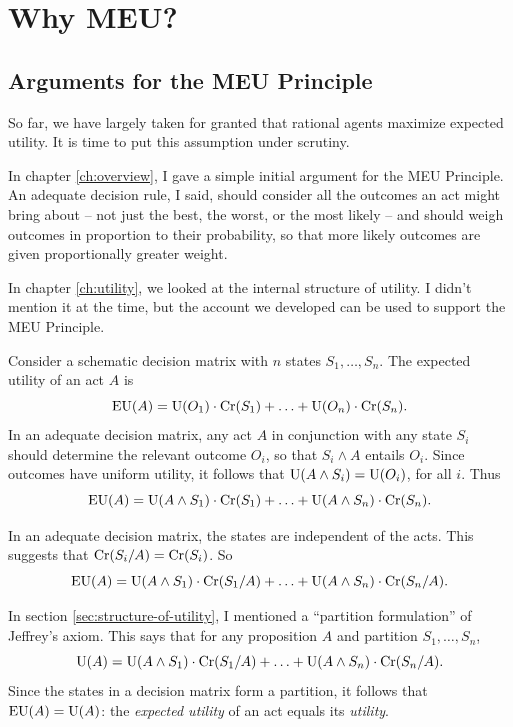 \chapter{Why MEU?}\label{ch:risk}

\section{Arguments for the MEU Principle}\label{sec:why-meu}

So far, we have largely taken for granted that rational agents maximize expected
utility. It is time to put this assumption under scrutiny.

In chapter \ref{ch:overview}, I gave a simple initial argument for the MEU
Principle. An adequate decision rule, I said, should consider all the outcomes
an act might bring about -- not just the best, the worst, or the most likely --
and should weigh outcomes in proportion to their probability, so that
more likely outcomes are given proportionally greater weight.

In chapter \ref{ch:utility}, we looked at the internal structure of utility. I
didn't mention it at the time, but the account we developed can be used to
support the MEU Principle.

Consider a schematic decision matrix with $n$ states $S_{1},\ldots,S_{n}$. The
expected utility of an act $A$ is
\[
  \text{EU}(A) = \text{U}(O_{1})\cdot \text{Cr}(S_{1}) + \ldots + \text{U}(O_{n})\cdot \text{Cr}(S_{n}).
\]
In an adequate decision matrix, any act $A$ in conjunction with any state
$S_{i}$ should determine the relevant outcome $O_{i}$, so that $S_{i} \land A$
entails $O_{i}$. Since outcomes have uniform utility, it follows that
$\text{U}(A \land S_{i}) = \text{U}(O_{i})$, for all $i$. Thus
\[
  \text{EU}(A) = \text{U}(A \land S_{1})\cdot \text{Cr}(S_{1}) + \ldots + \text{U}(A \land S_{n})\cdot \text{Cr}(S_{n}).
\]

In an adequate decision matrix, the states are independent of the acts. This suggests that $\text{Cr}(S_{i} / A) = \text{Cr}(S_{i})$. So
\[
  \text{EU}(A) = \text{U}(A \land S_{1})\cdot \text{Cr}(S_{1}/A) + \ldots + \text{U}(A \land S_{n})\cdot \text{Cr}(S_{n}/A).
\]

In section \ref{sec:structure-of-utility}, I mentioned a ``partition
formulation'' of Jeffrey's axiom. This says that for any proposition $A$ and
partition $S_{1},\ldots,S_{n}$,
\[
  \text{U}(A) = \text{U}(A \land S_{1})\cdot \text{Cr}(S_{1}/A) + \ldots + \text{U}(A \land S_{n})\cdot \text{Cr}(S_{n}/A).
\]
Since the states in a decision matrix form a partition, it follows that
$\text{EU}(A) = \text{U}(A)$: the \emph{expected utility} of an act equals its
\emph{utility}.

